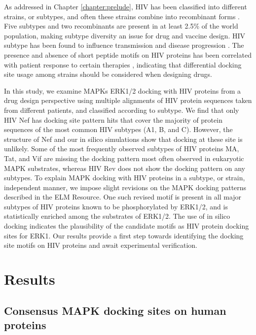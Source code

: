 As addressed in Chapter \ref{chapter:prelude}, HIV has been classified
into different strains, or subtypes, and often these strains combine
into recombinant forms \cite{taylor08}. Five subtypes and two
recombinants are present in at least 2.5\% of the world population,
making subtype diversity an issue for drug and vaccine design. HIV
subtype has been found to influence transmission and disease
progression \cite{taylor08}. The presence and absence of short peptide
motifs on HIV proteins has been correlated with patient response to
certain therapies \cite{dampier09}, indicating that differential
docking site usage among strains should be considered when designing
drugs.

In this study, we examine MAPKs ERK1/2 docking with HIV proteins from a
drug design perspective using multiple alignments of HIV protein
sequences taken from different patients, and classified according to
subtype. We find that only HIV Nef has docking site pattern hits that
cover the majority of protein sequences of the most common HIV
subtypes (A1, B, and C). However, the structure of Nef and our in
silico simulations show that docking at these site is unlikely. Some
of the most frequently observed subtypes of HIV proteins MA, Tat, and
Vif are missing the docking pattern most often observed in eukaryotic
MAPK substrates, whereas HIV Rev does not show the docking pattern on
any subtypes. To explain MAPK docking with HIV proteins in a subtype,
or strain, independent manner, we impose slight revisions on the MAPK
docking patterns described in the ELM Resource. One such revised motif
is present in all major subtypes of HIV proteins known to be
phosphorylated by ERK1/2, and is statistically enriched among the
substrates of ERK1/2. The use of in silico docking indicates the
plausibility of the candidate motifs as HIV protein docking sites for
ERK1. Our results provide a first step towards identifying the docking
site motifs on HIV proteins and await experimental verification.


\section{Results}

\subsection{Consensus MAPK docking sites on human proteins}

